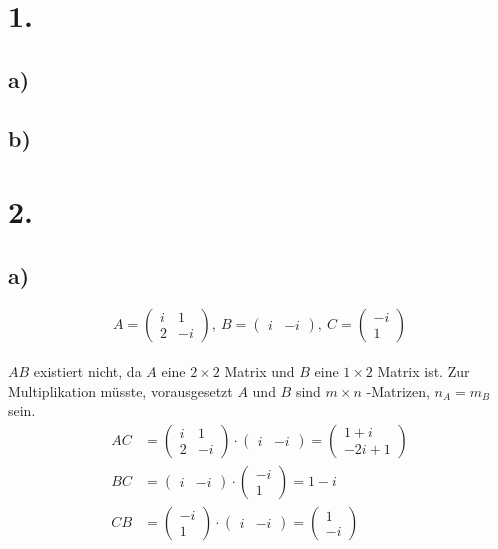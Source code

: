 \documentclass[a4paper]{scrartcl}
\title{\titleinfo}
\author{Elena Noll, Sven-Hendrik Haase, Arne Struck}
\date{\today}
\begin{document}
\maketitle
\notag
\section{1.}
\subsection{a)}
\subsection{b)}
\newpage %
\section{2.}
\subsection{a)}
\[
A=\begin{pmatrix}
i & 1 \\
2 & -i
\end{pmatrix},\ 
B=\begin{pmatrix}
i & -i
\end{pmatrix},\ 
C=\begin{pmatrix}
-i \\
1
\end{pmatrix}
\] \\
\(AB\) existiert nicht, da \(A\) eine \(2\times 2\) Matrix und \(B\) eine \(1\times 2\) Matrix ist. Zur Multiplikation müsste, vorausgesetzt \(A\) und \(B\) sind \(m\times n\) -Matrizen, \(n_A=m_B\) sein.
\begin{align}
AC&=
\begin{pmatrix}
i & 1 \\
2 & -i
\end{pmatrix}\cdot
\begin{pmatrix}
i & -i
\end{pmatrix}=
\begin{pmatrix}
1+i \\
-2i+1
\end{pmatrix} \\
BC&=
\begin{pmatrix}
i & -i
\end{pmatrix}\cdot
\begin{pmatrix}
-i \\
1
\end{pmatrix}=
1-i \\
CB&=
\begin{pmatrix}
-i \\
1
\end{pmatrix}
\cdot
\begin{pmatrix}
i & -i
\end{pmatrix}=
\begin{pmatrix}
1 \\
-i
\end{pmatrix}
\end{align}
\end{document}
